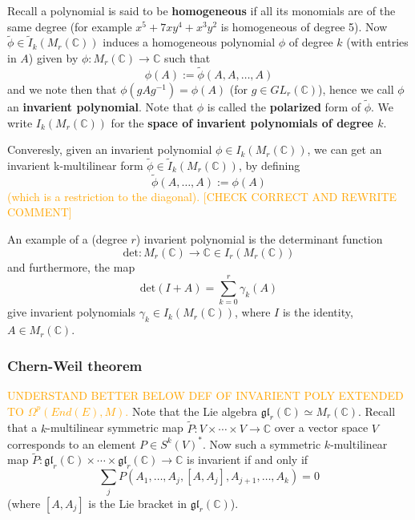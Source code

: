 \documentclass[a4paper]{article}
\theoremstyle{definition} \newtheorem*{definition}{Definition}
\theoremstyle{definition} \newtheorem*{definitions}{Definitions}
\theoremstyle{plain} \newtheorem{theorem}{Theorem}[section]
\theoremstyle{plain} \newtheorem{proposition}[theorem]{Proposition}
\theoremstyle{plain} \newtheorem{corollary}[theorem]{Corollary}
\theoremstyle{plain} \newtheorem{lemma}[theorem]{Lemma}
\theoremstyle{plain} \newtheorem{example}[theorem]{Example}
\newcommand{\understandBetter}[1]{\textcolor{orange}{#1}}
\newcommand{\defn}[1]{\textbf{#1}}
\newcommand{\complexnos}{\mathbb{C}}
\begin{document}
Recall a polynomial is said to be \defn{homogeneous} if all its monomials are of the same degree (for example $x^5 + 7xy^4 + x^3y^2$ is homogeneous of degree 5). Now $\tilde{\phi}\in \tilde{I}_k(M_r(\complexnos))$ induces a homogeneous polynomial $\phi$ of degree $k$ (with entries in $A$) given by $\phi:M_r(\complexnos)\to \complexnos$ such that
$$\phi(A):=\tilde{\phi}(A, A, \ldots, A)$$
and we note then that $\phi(gAg^{-1})=\phi(A)$ (for $g\in GL_r(\complexnos)$), hence we call $\phi$ an \defn{invarient polynomial}. Note that $\phi$ is called the \defn{polarized} form of $\tilde{\phi}$. We write $I_k(M_r(\complexnos))$ for the \defn{space of invarient polynomials of degree $k$}. 

Converesly, given an invarient polynomial $\phi \in I_k(M_r(\complexnos))$, we can get an invarient k-multilinear form $\tilde{\phi} \in \tilde{I}_k(M_r(\complexnos))$, by defining
$$\tilde{\phi}(A, \ldots, A):=\phi(A)$$
\understandBetter{(which is a restriction to the diagonal). [CHECK CORRECT AND REWRITE COMMENT]}

An example of a (degree $r$) invarient polynomial is the determinant function
$$\text{det}:M_r(\complexnos)\to \complexnos \in I_r(M_r(\complexnos))$$
and furthermore, the map
$$\text{det}(I+A)=\sum_{k=0}^r \gamma_k(A) $$
give invarient polynomials $\gamma_k\in I_k(M_r(\complexnos))$, where $I$ is the identity, $A \in M_r(\complexnos)$.

\subsubsection{Chern-Weil theorem}

\understandBetter{UNDERSTAND BETTER BELOW
DEF OF INVARIENT POLY EXTENDED TO $\Omega^p(End(E), M)$.}
Note that the Lie algebra $\mathfrak{gl}_r(\complexnos)\simeq M_r(\complexnos)$. Recall that a $k$-multilinear symmetric map $\tilde{P}:V\times \cdots \times V\to \complexnos$ over a vector space $V$ corresponds to an element $P\in S^k(V)^*$. Now such a symmetric $k$-multilinear map $\tilde{P}: \mathfrak{gl}_r(\complexnos)\times \cdots \times \mathfrak{gl}_r(\complexnos)\to \complexnos$ is invarient if and only if 
$$\sum_j P(A_1, \ldots, A_j, [A, A_j], A_{j+1}, \ldots, A_k)=0$$
(where $[A, A_j]$ is the Lie bracket in $\mathfrak{gl}_r(\complexnos)$). 
\end{document}
